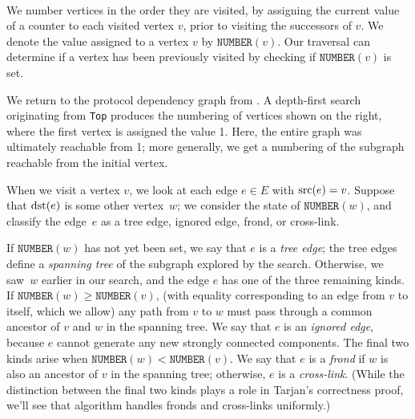 \documentclass[../generics]{subfiles}
\begin{document}
\newcommand{\Number}[1]{\texttt{NUMBER}(#1)}
\newcommand{\Lowlink}[1]{\texttt{LOWLINK}(#1)}
\newcommand{\OnStack}[1]{\texttt{ONSTACK}(#1)}

\begin{figure}
\,
\end{figure}

We number vertices in the order they are visited, by assigning the current value of a counter to each visited vertex $v$, prior to visiting the successors of $v$. We denote the value assigned to a vertex $v$ by $\Number{v}$. Our traversal can determine if a vertex has been previously visited by checking if $\Number{v}$ is set.

We return to the protocol dependency graph from . A depth-first search originating from \texttt{Top} produces the numbering of vertices shown on the right, where the first vertex is assigned the value 1. Here, the entire graph was ultimately reachable from 1; more generally, we get a numbering of the subgraph reachable from the initial vertex.

When we visit a vertex $v$, we look at each edge $e\in E$ with $\operatorname{src}(e)=v$. Suppose that $\operatorname{dst}(e)$ is some other vertex~$w$; we consider the state of $\Number{w}$, and classify the edge~$e$ as a tree edge, ignored edge, frond, or cross-link.

If $\Number{w}$ has not yet been set, we say that $e$ is a \emph{tree edge}; the tree edges define a \emph{spanning tree} of the subgraph explored by the search. Otherwise, we saw~$w$ earlier in our search, and the edge $e$ has one of the three remaining kinds. If $\Number{w}\geq\Number{v}$, (with equality corresponding to an edge from $v$ to itself, which we allow) any path from $v$ to $w$ must pass through a common ancestor of $v$ and $w$ in the spanning tree. We say that $e$ is an \emph{ignored edge}, because $e$ cannot generate any new strongly connected components. The final two kinds arise when $\Number{w}<\Number{v}$. We say that $e$ is a \emph{frond} if $w$ is also an ancestor of $v$ in the spanning tree; otherwise, $e$ is a \emph{cross-link}. (While the distinction between the final two kinds plays a role in Tarjan's correctness proof, we'll see that algorithm handles fronds and cross-links uniformly.)
\end{document}
